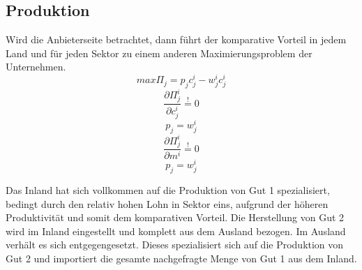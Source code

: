 \subsection{Produktion}
Wird die Anbieterseite betrachtet, dann führt der komparative Vorteil in jedem Land und f{\"u}r jeden Sektor zu einem anderen Maximierungsproblem der Unternehmen. 
\begin{equation} max\Pi_j=p_jc^i_j-w^i_jc^i_j\end{equation}
\begin{equation}\frac{\partial \Pi^i_j}{\partial c^i_j}\overset{!}{=}0\end{equation} 
\begin{equation}p_j=w^i_j\end{equation}
\begin{equation}\frac{\partial \Pi^i_j}{\partial m^i}\overset{!}{=}0\end{equation}
\begin{equation}p_j=w^i_j\end{equation}
\begin{flushright}
\begin{center}
\end{center}
\end{flushright}
Das Inland hat sich vollkommen auf die Produktion von Gut 1 spezialisiert, bedingt durch den relativ hohen Lohn in Sektor eins, aufgrund der h{\"o}heren Produktivit{\"a}t und somit dem komparativen Vorteil. Die Herstellung von Gut 2 wird im Inland eingestellt und komplett aus dem Ausland bezogen. Im Ausland verh{\"a}lt es sich entgegengesetzt. Dieses spezialisiert sich auf die Produktion von Gut 2 und importiert die gesamte nachgefragte Menge von Gut 1 aus dem Inland. 

